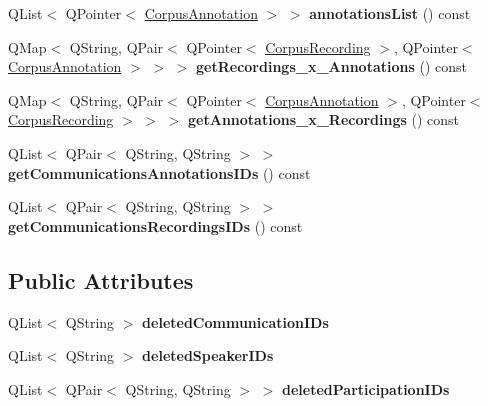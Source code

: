 \begin{DoxyCompactItemize}
Q\+List$<$ Q\+Pointer$<$ \hyperlink{class_corpus_annotation}{Corpus\+Annotation} $>$ $>$ {\bfseries annotations\+List} () const
\item 
\mbox{\label{class_corpus_abd5174294912f577ba912c7d7fe3990f}} 
Q\+Map$<$ Q\+String, Q\+Pair$<$ Q\+Pointer$<$ \hyperlink{class_corpus_recording}{Corpus\+Recording} $>$, Q\+Pointer$<$ \hyperlink{class_corpus_annotation}{Corpus\+Annotation} $>$ $>$ $>$ {\bfseries get\+Recordings\+\_\+x\+\_\+\+Annotations} () const
\item 
\mbox{\label{class_corpus_a44b6483e0cea2f124272ce79905ba05f}} 
Q\+Map$<$ Q\+String, Q\+Pair$<$ Q\+Pointer$<$ \hyperlink{class_corpus_annotation}{Corpus\+Annotation} $>$, Q\+Pointer$<$ \hyperlink{class_corpus_recording}{Corpus\+Recording} $>$ $>$ $>$ {\bfseries get\+Annotations\+\_\+x\+\_\+\+Recordings} () const
\item 
\mbox{\label{class_corpus_aeb1454b56f0e11cf8ae5f91f8d6f4c1e}} 
Q\+List$<$ Q\+Pair$<$ Q\+String, Q\+String $>$ $>$ {\bfseries get\+Communications\+Annotations\+I\+Ds} () const
\item 
\mbox{\label{class_corpus_ae84db3aaf9ad1b0cae5fac3196b77088}} 
Q\+List$<$ Q\+Pair$<$ Q\+String, Q\+String $>$ $>$ {\bfseries get\+Communications\+Recordings\+I\+Ds} () const
\end{DoxyCompactItemize}
\subsection*{Public Attributes}
\begin{DoxyCompactItemize}
\item 
\mbox{\label{class_corpus_a55599dacff53f4ea699a1758f3a2aaeb}} 
Q\+List$<$ Q\+String $>$ {\bfseries deleted\+Communication\+I\+Ds}
\item 
\mbox{\label{class_corpus_adf9500d71cba6f1179681acbe17ca7af}} 
Q\+List$<$ Q\+String $>$ {\bfseries deleted\+Speaker\+I\+Ds}
\item 
\mbox{\label{class_corpus_a09ad0d669adf1007f31ea1786b6be918}} 
Q\+List$<$ Q\+Pair$<$ Q\+String, Q\+String $>$ $>$ {\bfseries deleted\+Participation\+I\+Ds}
\end{DoxyCompactItemize}
